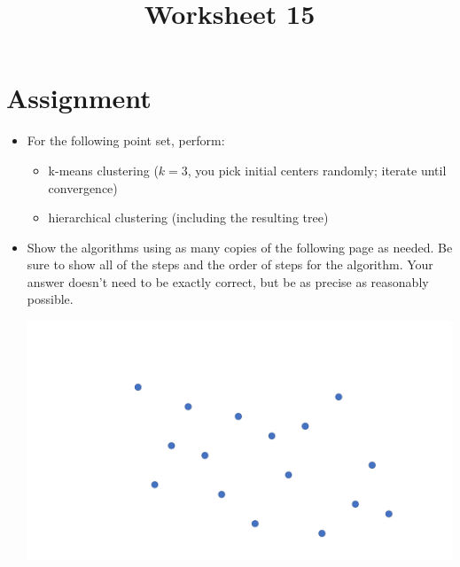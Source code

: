 \documentclass[a4paper,12pt]{article}
\title{Worksheet 15}
\begin{document}
\maketitle

\worksheetGroundRules


\worksheetSubmission



\vspace{5pt}
\section{Assignment}

\begin{itemize}



\item For the following point set, perform:
\begin{itemize}[noitemsep]
\item k-means clustering ($k=3$, you pick initial centers randomly; iterate until convergence)
\item hierarchical clustering (including the resulting tree)
\end{itemize}

\item Show the algorithms using as many copies of the following page as needed. Be sure to show all of the steps and the order of steps for the algorithm. Your answer doesn't need to be exactly correct, but be as precise as reasonably possible.

\begin{center}
\includegraphics[width=0.75\linewidth]{../images/spatial_subd.pdf}
\end{center}



\end{itemize}



\newpage
\end{document}
